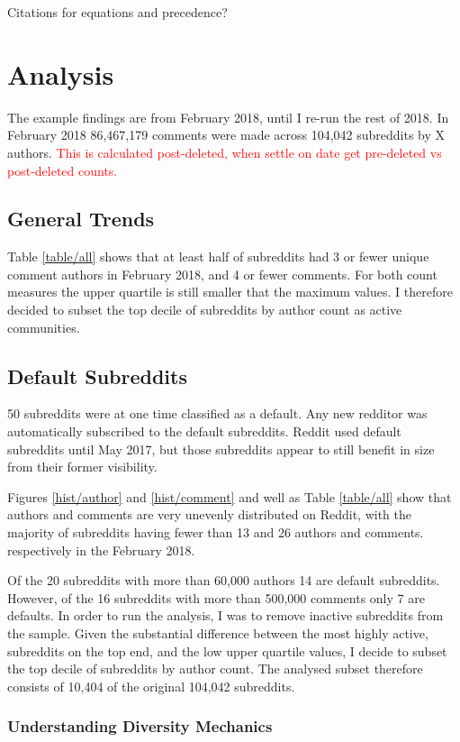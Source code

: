 \documentclass{article}
\begin{document}
Citations for equations and precedence?


\section{Analysis}

The example findings are from February 2018, until I re-run the rest of 2018. In February 2018 86,467,179 comments were made across 104,042 subreddits by X authors. \textcolor{red}{This is calculated post-deleted, when settle on date get pre-deleted vs post-deleted counts.}

\subsection{General Trends}

Table \ref{table/all} shows that at least half of subreddits had 3 or fewer unique comment authors in February 2018, and 4 or fewer comments. For both count measures the upper quartile is still smaller that the maximum values. I therefore decided to subset the top decile of subreddits by author count as active communities.


\subsection{Default Subreddits}
50 subreddits were at one time classified as a default. Any new redditor was automatically subscribed to the default subreddits. Reddit used default subreddits until May 2017, but those subreddits appear to still benefit in size from their former visibility.

Figures \ref{hist/author} and  \ref{hist/comment} and well as Table \ref{table/all} show that authors and comments are very unevenly distributed on Reddit, with the majority of subreddits having fewer than 13 and 26 authors and comments. respectively in the February 2018.

Of the 20 subreddits with more than 60,000 authors 14 are default subreddits. However, of the 16 subreddits with more than 500,000 comments only 7 are defaults. In order to run the analysis, I was to remove inactive subreddits from the sample. Given the substantial difference between the most highly active, subreddits on the top end, and the low upper quartile values, I decide to subset the top decile of subreddits by author count. The analysed subset therefore consists of 10,404 of the original 104,042 subreddits.


\subsubsection{Understanding Diversity Mechanics}
\end{document}
